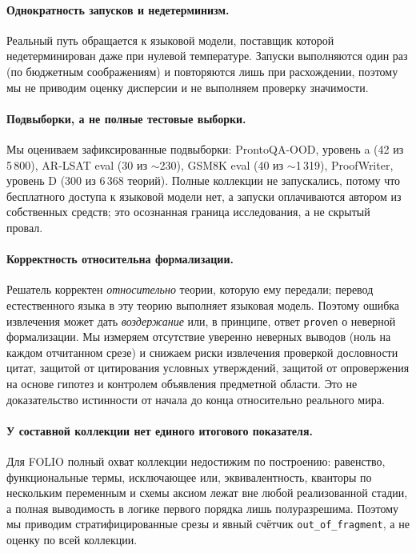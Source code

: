 \documentclass[11pt,a4paper]{article}
\begin{document}
\paragraph{Однократность запусков и недетерминизм.} Реальный путь обращается к языковой модели, поставщик
которой недетерминирован даже при нулевой температуре. Запуски выполняются один раз (по бюджетным соображениям)
и повторяются лишь при расхождении, поэтому мы не приводим оценку дисперсии и не выполняем проверку значимости.

\paragraph{Подвыборки, а не полные тестовые выборки.} Мы оцениваем зафиксированные подвыборки: ProntoQA-OOD,
уровень a (42 из 5\,800), AR-LSAT eval (30 из $\sim$230), GSM8K eval (40 из $\sim$1\,319), ProofWriter,
уровень D (300 из 6\,368 теорий). Полные коллекции не запускались, потому что бесплатного доступа к
языковой модели нет, а запуски оплачиваются автором из собственных средств; это осознанная граница
исследования, а не скрытый провал.

\paragraph{Корректность относительна формализации.} Решатель корректен \emph{относительно} теории, которую
ему передали; перевод естественного языка в эту теорию выполняет языковая модель. Поэтому ошибка извлечения
может дать \emph{воздержание} или, в принципе, ответ \texttt{proven} о неверной формализации. Мы измеряем
отсутствие уверенно неверных выводов (ноль на каждом отчитанном срезе) и снижаем риски извлечения проверкой
дословности цитат, защитой от цитирования условных утверждений, защитой от опровержения на основе гипотез и
контролем объявления предметной области. Это не доказательство истинности от начала до конца относительно
реального мира.

\paragraph{У составной коллекции нет единого итогового показателя.} Для FOLIO полный охват коллекции недостижим
по построению: равенство, функциональные термы, исключающее или, эквивалентность, кванторы по нескольким
переменным и схемы аксиом лежат вне любой реализованной стадии, а полная выводимость в логике первого порядка
лишь полуразрешима. Поэтому мы приводим стратифицированные срезы и явный счётчик \texttt{out\_of\_fragment},
а не оценку по всей коллекции.
\end{document}
